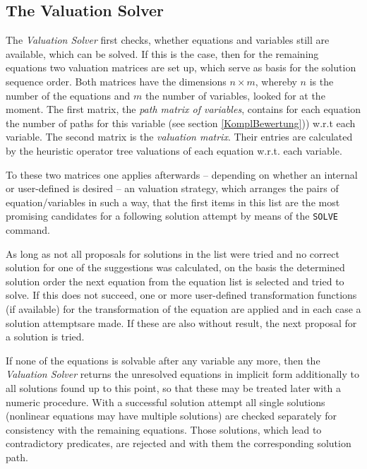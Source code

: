 \clearpage

\subsection{The Valuation Solver} %

The {\em Valuation Solver} first checks,  whether equations and variables still  are available, which can be solved. 
If this is the case, then for the remaining equations two valuation matrices are set up, which serve as basis for the solution sequence order. Both matrices have the dimensions $n \times m$, whereby $n$ is the number of the equations and $m$ the number of variables,  looked for at the moment. The first matrix, the  {\em  path matrix of variables}, contains for each equation the number of  paths for this variable (see section \ref{KomplBewertung})) w.r.t each variable. The second matrix is the  {\em valuation matrix}. Their entries are calculated by the heuristic operator tree valuations of each equation w.r.t. each variable.


To these two matrices one applies  afterwards  -- depending on whether an internal or user-defined  is desired -- an valuation strategy, which arranges the pairs of equation/variables in such a way, that the first items  in this list are the most promising candidates for a following solution attempt  by means of the \verb+SOLVE+ command.

As long as not all proposals for solutions in the list were tried  and no correct solution for one of the suggestions was  calculated, on the basis the determined solution order the next equation from the equation list is selected and tried to solve. If this does not succeed, one or more user-defined transformation functions (if available) for the transformation of the equation are applied and  in each case a solution attemptsare  made.  If these are also without result, the next proposal for a solution is tried.

If  none of the equations is solvable after any variable any more, then the {\em Valuation Solver} returns the unresolved equations in implicit form additionally to all solutions found up to this point, so that these  may be treated later with a numeric procedure. With a successful solution attempt all single solutions (nonlinear equations may have multiple solutions) are checked separately for consistency with the remaining equations. Those solutions, which lead to contradictory predicates, are rejected and with them the corresponding solution path.

